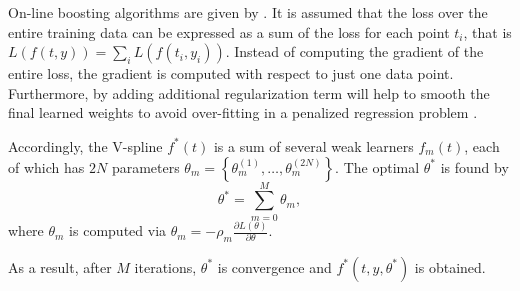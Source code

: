 On-line boosting algorithms are given by \cite{babenko2009family, beygelzimer2015online}. It is assumed that the loss over the entire training data can be expressed as a sum of the loss for each point $t_i$, that is $L(f(t,y))=\sum_i L(f(t_i,y_i))$. Instead of computing the gradient of the entire loss, the gradient is computed with respect to just one data point. Furthermore, by adding additional regularization term will help to smooth the final learned weights to avoid over-fitting in a penalized regression problem \citep{chen2016xgboost}. 

Accordingly, the V-spline $f^*(t)$ is a sum of several weak learners $f_m(t)$, each of which has $2N$ parameters $\theta_m=\left\lbrace \theta_m^{(1)},\ldots,\theta_m^{(2N)}\right\rbrace$. The optimal $\theta^*$ is found by 
\begin{equation}
\theta^*=\sum_{m=0}^{M}\theta_m,
\end{equation}
where $\theta_m$ is computed via $\theta_m=-\rho_m\frac{\partial L(\theta)}{\partial \theta}$. 

As a result, after $M$ iterations, $\theta^*$ is convergence and $f^*(t,y,\theta^*)$ is obtained. 


%
%
%



